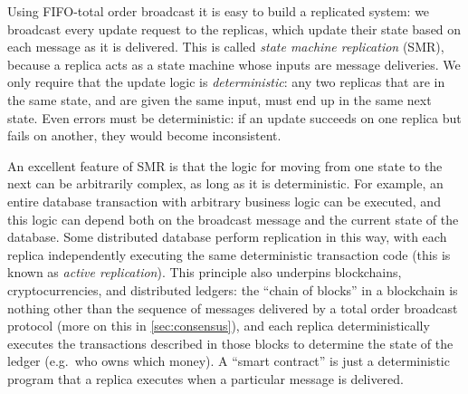 Using FIFO-total order broadcast it is easy to build a replicated system: we broadcast every update request to the replicas, which update their state based on each message as it is delivered.
This is called \emph{state machine replication} (SMR), because a replica acts as a state machine whose inputs are message deliveries.
We only require that the update logic is \emph{deterministic}: any two replicas that are in the same state, and are given the same input, must end up in the same next state.
Even errors must be deterministic: if an update succeeds on one replica but fails on another, they would become inconsistent.

An excellent feature of SMR is that the logic for moving from one state to the next can be arbitrarily complex, as long as it is deterministic.
For example, an entire database transaction with arbitrary business logic can be executed, and this logic can depend both on the broadcast message and the current state of the database.
Some distributed database perform replication in this way, with each replica independently executing the same deterministic transaction code (this is known as \emph{active replication}).
This principle also underpins blockchains, cryptocurrencies, and distributed ledgers: the ``chain of blocks'' in a blockchain is nothing other than the sequence of messages delivered by a total order broadcast protocol (more on this in \autoref{sec:consensus}), and each replica deterministically executes the transactions described in those blocks to determine the state of the ledger (e.g.\ who owns which money).
A ``smart contract'' is just a deterministic program that a replica executes when a particular message is delivered.


